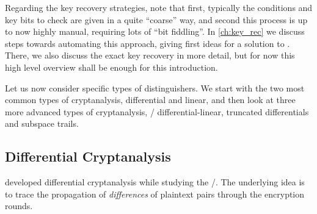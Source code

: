 Regarding the key recovery strategies, note that first, typically the conditions and key bits to check are given in a quite \enquote{coarse} way, and second this process is up to now highly manual, requiring lots of \enquote{bit fiddling}.
In \cref{ch:key_rec} we discuss steps towards automating this approach, giving first ideas for a solution to .
There, we also discuss the exact key recovery in more detail, but for now this high level overview shall be enough for this introduction.

Let us now consider specific types of distinguishers.
We start with the two most common types of cryptanalysis, differential and linear, and then look at three more advanced types of cryptanalysis, \ie/ differential-linear, truncated differentials and subspace trails.

\subsection{Differential Cryptanalysis}\label{sec:prelim:dc}
\textcite{C:BihSha90} developed differential cryptanalysis while studying the \DES/.
The underlying idea is to trace the propagation of \emph{differences} of plaintext pairs through the encryption rounds.
